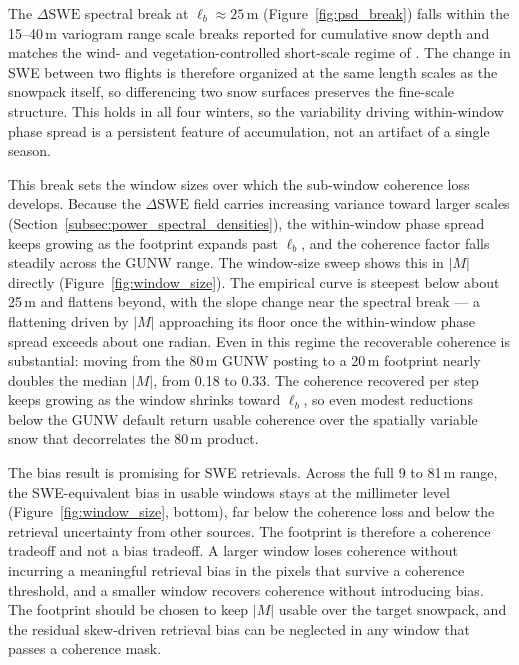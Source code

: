 \documentclass[tc, manuscript]{copernicus}
\begin{document}
The $\Delta\mathrm{SWE}$ spectral break at $\ell_b \approx 25$\,\unit{m} (Figure~\ref{fig:psd_break}) falls within the 15--40\,\unit{m} variogram range scale breaks reported for cumulative snow depth and matches the wind- and vegetation-controlled short-scale regime of \citet{trujillo2007topographic-0ec}. The change in SWE between two flights is therefore organized at the same length scales as the snowpack itself, so differencing two snow surfaces preserves the fine-scale structure. This holds in all four winters, so the variability driving within-window phase spread is a persistent feature of accumulation, not an artifact of a single season.

This break sets the window sizes over which the sub-window coherence loss develops. Because the $\Delta\mathrm{SWE}$ field carries increasing variance toward larger scales (Section~\ref{subsec:power_spectral_densities}), the within-window phase spread keeps growing as the footprint expands past $\ell_b$, and the coherence factor falls steadily across the GUNW range. The window-size sweep shows this in $|M|$ directly (Figure~\ref{fig:window_size}). The empirical curve is steepest below about 25\,\unit{m} and flattens beyond, with the slope change near the spectral break --- a flattening driven by $|M|$ approaching its floor once the within-window phase spread exceeds about one radian. Even in this regime the recoverable coherence is substantial: moving from the 80\,\unit{m} GUNW posting to a 20\,\unit{m} footprint nearly doubles the median $|M|$, from 0.18 to 0.33. The coherence recovered per step keeps growing as the window shrinks toward $\ell_b$, so even modest reductions below the GUNW default return usable coherence over the spatially variable snow that decorrelates the 80\,\unit{m} product.

The bias result is promising for SWE retrievals. Across the full 9 to 81\,\unit{m} range, the SWE-equivalent bias in usable windows stays at the millimeter level (Figure~\ref{fig:window_size}, bottom), far below the coherence loss and below the retrieval uncertainty from other sources. The footprint is therefore a coherence tradeoff and not a bias tradeoff. A larger window loses coherence without incurring a meaningful retrieval bias in the pixels that survive a coherence threshold, and a smaller window recovers coherence without introducing bias. The footprint should be chosen to keep $|M|$ usable over the target snowpack, and the residual skew-driven retrieval bias can be neglected in any window that passes a coherence mask.
\end{document}
